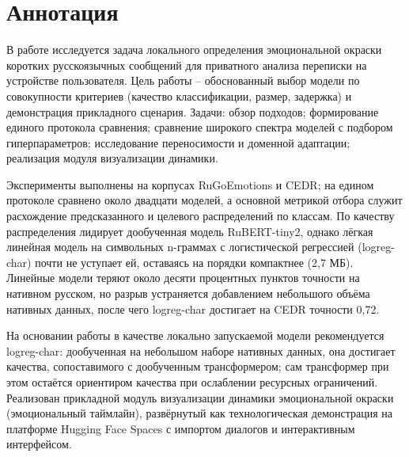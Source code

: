 \documentclass[12pt,a4paper]{report}
\begin{document}
\chapter*{Аннотация}
В работе исследуется задача локального определения эмоциональной окраски коротких русскоязычных сообщений для приватного анализа переписки на устройстве пользователя. Цель работы -- обоснованный выбор модели по совокупности критериев (качество классификации, размер, задержка) и демонстрация прикладного сценария. Задачи: обзор подходов; формирование единого протокола сравнения; сравнение широкого спектра моделей с подбором гиперпараметров; исследование переносимости и доменной адаптации; реализация модуля визуализации динамики.

Эксперименты выполнены на корпусах RuGoEmotions и CEDR; на едином протоколе сравнено около двадцати моделей, а основной метрикой отбора служит расхождение предсказанного и целевого распределений по классам. По качеству распределения лидирует дообученная модель RuBERT-tiny2, однако лёгкая линейная модель на символьных n-граммах с логистической регрессией (logreg-char) почти не уступает ей, оставаясь на порядки компактнее (2,7 МБ). Линейные модели теряют около десяти процентных пунктов точности на нативном русском, но разрыв устраняется добавлением небольшого объёма нативных данных, после чего logreg-char достигает на CEDR точности 0,72.

На основании работы в качестве локально запускаемой модели рекомендуется logreg-char: дообученная на небольшом наборе нативных данных, она достигает качества, сопоставимого с дообученным трансформером; сам трансформер при этом остаётся ориентиром качества при ослаблении ресурсных ограничений. Реализован прикладной модуль визуализации динамики эмоциональной окраски (эмоциональный таймлайн), развёрнутый как технологическая демонстрация на платформе Hugging Face Spaces с импортом диалогов и интерактивным интерфейсом.

\clearpage
\tableofcontents
\clearpage
\end{document}
